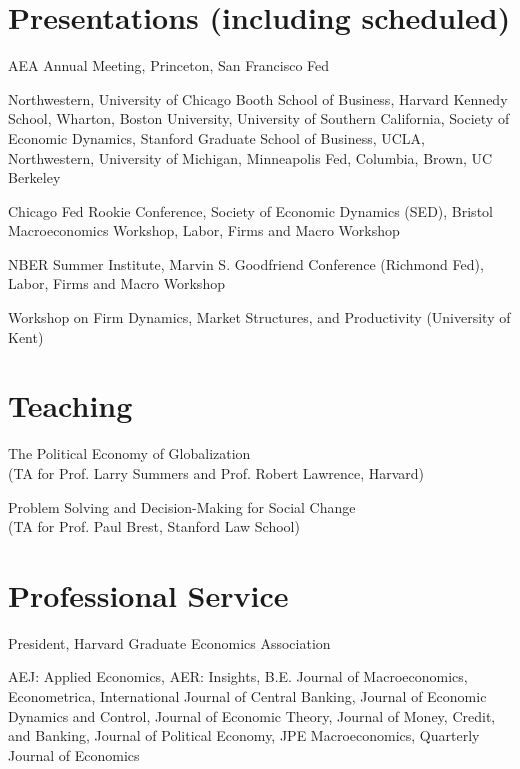 \documentclass[letterpaper]{article}
\def\footerlink{http://jblevins.org/projects/cv-template/}
\begin{document}
\section*{Presentations (including scheduled)}
\begin{description}[labelindent=0pt, labelwidth=1in, labelsep*=1em, leftmargin =!, font=\normalfont]
\item[2025] AEA Annual Meeting, Princeton, San Francisco Fed
\item[2024] Northwestern, University of Chicago Booth School of Business, Harvard Kennedy School, Wharton, Boston University, University of Southern California, Society of Economic Dynamics, Stanford Graduate School of Business, UCLA, Northwestern, University of Michigan, Minneapolis Fed, Columbia, Brown, UC Berkeley %
\item[2023] Chicago Fed Rookie Conference, Society of Economic Dynamics (SED), Bristol Macroeconomics Workshop, Labor, Firms and Macro Workshop
\item[2022] NBER Summer Institute, Marvin S. Goodfriend Conference (Richmond Fed), Labor, Firms and Macro Workshop
\item[2021] Workshop on Firm Dynamics, Market Structures, and Productivity (University of Kent) 
\end{description}

\section*{Teaching}
\begin{description}[labelindent=0pt, labelwidth=1in, labelsep*=1em, leftmargin =!, font=\normalfont]
\item[2021] The Political Economy of Globalization\\ (TA for Prof. Larry Summers and Prof. Robert Lawrence, Harvard) 
\item[2015] Problem Solving and Decision-Making for Social Change\\ (TA for Prof. Paul Brest, Stanford Law School)
\end{description}

\section*{Professional Service}
\begin{description}[labelindent=0pt, labelwidth=1in, labelsep*=1em, leftmargin =!, font=\normalfont]
\item[2021--2021] President, Harvard Graduate Economics Association
\item[Refereeing] {AEJ: Applied Economics, AER: Insights, B.E. Journal of Macroeconomics, Econometrica, International Journal of Central Banking, Journal of Economic Dynamics and Control, Journal of Economic Theory, Journal of Money, Credit, and Banking, Journal of Political Economy, JPE Macroeconomics, Quarterly Journal of Economics}
\end{description}


\end{document}
